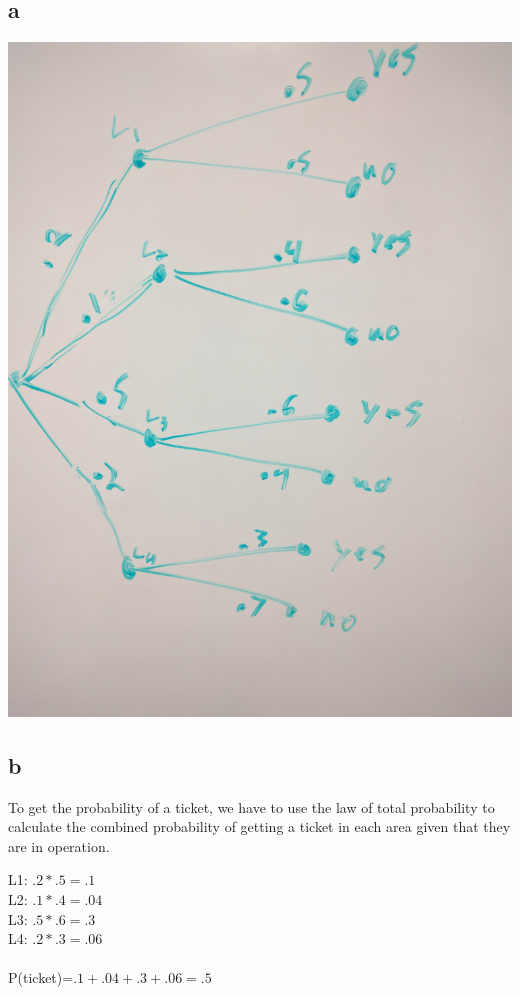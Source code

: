 \documentclass[10pt,letterpaper]{article}
\begin{document}
\subsection*{a}
\includegraphics[scale=.1]{tree}

\subsection*{b}
To get the probability of a ticket, we have to use the law of total probability
to calculate the combined probability of getting a ticket in each area given
that they are in operation.

\noindent L1: $ .2*.5=.1 $\\
L2: $ .1*.4=.04 $\\
L3: $ .5*.6=.3 $\\
L4: $ .2*.3=.06 $\\
\\
P(ticket)=$ .1+.04+.3+.06=.5$
\end{document}
